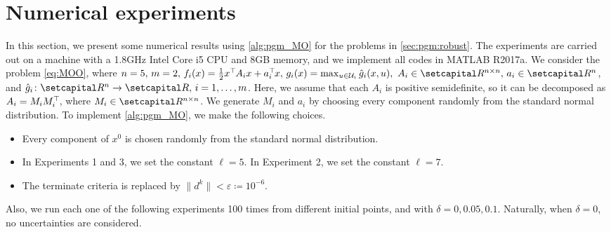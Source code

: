 \documentclass[../main]{subfiles}
\begin{document}
\section{Numerical experiments} \label{sec:pgm:experiments}
In this section, we present some numerical results using \cref{alg:pgm_MO} for the problems in \cref{sec:pgm:robust}. The experiments are carried out on a machine with a 1.8GHz Intel Core i5 CPU and 8GB memory, and we implement all codes in MATLAB R2017a. We consider the problem \cref{eq:MOO}, where $n = 5,\, m = 2,\, f_i(x) = \frac{1}{2} x^\T A_i x + a_i^\T x,\, g_i(x) = \max_{u \in {\mathcal{U}}_i } \hat{g}_i (x,u),\ A_i \in \setR^{n \times n},\, a_i \in \setR^n$, and $\hat{g}_i\colon \setR^n \to \setR,\, i = 1,\ldots, m$. Here, we assume that each $A_i$ is positive semidefinite, so it can be decomposed as $A_i = M_i M_i^\top\hspace{-1pt}$, where $M_i \in \setR^{n \times n}$. We generate $M_i$ and $a_i$ by choosing every component randomly from the standard normal distribution. To implement \cref{alg:pgm_MO}, we make the following choices.
\begin{remark}
\begin{itemize}
\item Every component of $x^0$ is chosen randomly from the standard normal distribution.
\item In Experiments 1 and 3, we set the constant $\ell = 5$. In Experiment 2, we set the constant $\ell = 7$.
\item The terminate criteria is replaced by $\|d^k\| < \varepsilon \coloneqq 10^{-6}$.
\end{itemize}
\end{remark}

Also, we run each one of the following experiments 100 times from different initial points, and with $\delta = 0, 0.05, 0.1$. Naturally, when $\delta = 0$, no uncertainties are considered.
\end{document}
